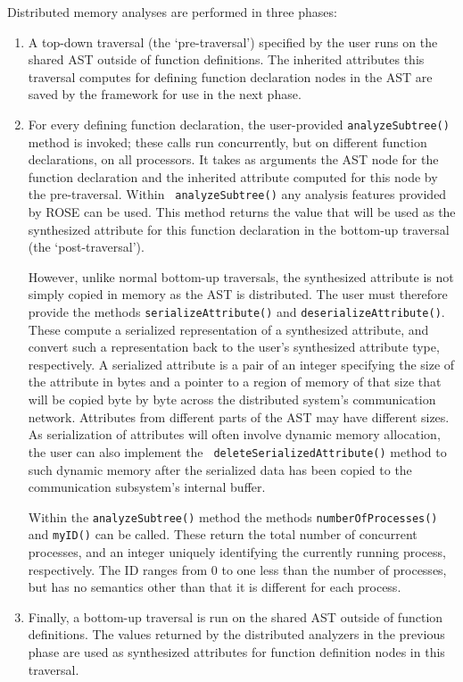     Distributed memory analyses are performed in three phases:
\begin{enumerate}
\item A top-down traversal (the `pre-traversal') specified by the user runs on the shared AST outside of function
definitions. The inherited attributes this traversal computes for defining function declaration nodes in the AST are
saved by the framework for use in the next phase.

\item For every defining function declaration, the user-provided {\tt analyzeSubtree()} method is invoked; these calls
run concurrently, but on different function declarations, on all processors. It takes as arguments the AST node for the
function declaration and the inherited attribute computed for this node by the pre-traversal. Within {\tt
analyzeSubtree()} any analysis features provided by ROSE can be used. This method returns the value that will be used as
the synthesized attribute for this function declaration in the bottom-up traversal (the `post-traversal').

However, unlike normal bottom-up traversals, the synthesized attribute is not simply copied in memory as the AST is
distributed. The user must therefore provide the methods {\tt serializeAttribute()} and {\tt deserializeAttribute()}.
These compute a serialized representation of a synthesized attribute, and convert such a representation back to the
user's synthesized attribute type, respectively. A serialized attribute is a pair of an integer specifying the size of
the attribute in bytes and a pointer to a region of memory of that size that will be copied byte by byte across the
distributed system's communication network. Attributes from different parts of the AST may have different sizes. As
serialization of attributes will often involve dynamic memory allocation, the user can also implement the {\tt
deleteSerializedAttribute()} method to such dynamic memory after the serialized data has been copied to the
communication subsystem's internal buffer.

Within the {\tt analyzeSubtree()} method the methods {\tt numberOfProcesses()} and {\tt myID()} can be called. These
return the total number of concurrent processes, and an integer uniquely identifying the currently running process,
respectively. The ID ranges from 0 to one less than the number of processes, but has no semantics other than that it is
different for each process.

\item Finally, a bottom-up traversal is run on the shared AST outside of function definitions. The values returned by
the distributed analyzers in the previous phase are used as synthesized attributes for function definition nodes in this
traversal.
\end{enumerate}

